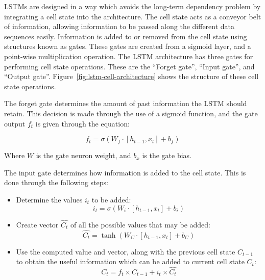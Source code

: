 LSTMs are designed in a way which avoids the long-term dependency problem by integrating a cell state into the architecture. The cell state acts as a conveyor belt of information, allowing information to be passed along the different data sequences easily. Information is added to or removed from the cell state using structures known as gates. These gates are created from a sigmoid layer, and a point-wise multiplication operation. The LSTM architecture has three gates for performing cell state operations. These are the ``Forget gate'', ``Input gate'', and ``Output gate''. Figure~\ref{fig:lstm-cell-architecture} shows the structure of these cell state operations.\par

The forget gate determines the amount of past information the LSTM should retain. This decision is made through the use of a sigmoid function, and the gate output $f_{t}$ is given through the equation:

\begin{equation}
    f_{t} = \sigma(W_{f}\cdot[h_{t-1}, x_{t}] + b_{f})
\end{equation}

Where $W$ is the gate neuron weight, and $b_{x}$ is the gate bias.\par

The input gate determines how information is added to the cell state. This is done through the following steps:
\begin{itemize}
    \item Determine the values $i_{t}$ to be added:
    \begin{equation}
        \label{eqn:input-gate}
        i_{t} = \sigma(W_{i}\cdot[h_{t-1}, x_{t}] + b_{i})
    \end{equation}
    \item Create vector $\hat{C_{t}}$ of all the possible values that may be added:
    \begin{equation}
        \hat{C_{t}} = \tanh( W_{C}\cdot[h_{t-1}, x_{t}] + b_{C})
    \end{equation}
    \item Use the computed value and vector, along with the previous cell state $C_{t-1}$ to obtain the useful information which can be added to current cell state $C_{t}$:
    \begin{equation}
        C_{t} = f_{t} \times C_{t-1} + i_{t} \times \hat{C_{t}}
    \end{equation}
\end{itemize}

